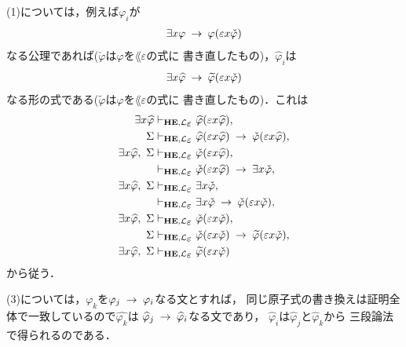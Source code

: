 \begin{metaprf}
		(1)については，例えば$\varphi_{i}$が
		\begin{align}
			\exists x \varphi \hspace{0.25em}\rightarrow\hspace{0.25em} \varphi(\varepsilon x \check{\varphi})
		\end{align}
		なる公理であれば($\check{\varphi}$は$\varphi$を$\lang{\varepsilon}$の式に
		書き直したもの)，$\widehat{\varphi}_{i}$は
		\begin{align}
			\exists x \widehat{\varphi} \hspace{0.25em}\rightarrow\hspace{0.25em} \widetilde{\varphi}(\varepsilon x \check{\varphi})
		\end{align}
		なる形の式である($\widetilde{\varphi}$は$\varphi$を$\lang{\varepsilon}$の式に
		書き直したもの)．これは
		\begin{align}
			\exists x \widehat{\varphi} &\provable{\mbox{{\bf HE}},\lang{\varepsilon}} \widehat{\varphi}(\varepsilon x \widehat{\varphi}), \\
			\Sigma &\provable{\mbox{{\bf HE}},\lang{\varepsilon}} \widehat{\varphi}(\varepsilon x \widehat{\varphi}) \rarrow \check{\varphi}(\varepsilon x \widehat{\varphi}), \\
			\exists x \widehat{\varphi},\ \Sigma &\provable{\mbox{{\bf HE}},\lang{\varepsilon}} \check{\varphi}(\varepsilon x \widehat{\varphi}), \\
			&\provable{\mbox{{\bf HE}},\lang{\varepsilon}} \check{\varphi}(\varepsilon x \widehat{\varphi}) \rarrow \exists x \check{\varphi}, \\
			\exists x \widehat{\varphi},\ \Sigma &\provable{\mbox{{\bf HE}},\lang{\varepsilon}} \exists x \check{\varphi}, \\
			&\provable{\mbox{{\bf HE}},\lang{\varepsilon}} \exists x \check{\varphi} \rarrow \check{\varphi}(\varepsilon x \check{\varphi}), \\
			\exists x \widehat{\varphi},\ \Sigma &\provable{\mbox{{\bf HE}},\lang{\varepsilon}} \check{\varphi}(\varepsilon x \check{\varphi}), \\
			\Sigma &\provable{\mbox{{\bf HE}},\lang{\varepsilon}} \check{\varphi}(\varepsilon x \check{\varphi}) \rarrow  \widetilde{\varphi}(\varepsilon x \check{\varphi}), \\
			\exists x \widehat{\varphi},\ \Sigma &\provable{\mbox{{\bf HE}},\lang{\varepsilon}} \widetilde{\varphi}(\varepsilon x \check{\varphi})
		\end{align}
		から従う．
		
		(3)については，$\varphi_{k}$を$\varphi_{j} \hspace{0.25em}\rightarrow\hspace{0.25em} \varphi_{i}$なる文とすれば，
		同じ原子式の書き換えは証明全体で一致しているので$\widehat{\varphi_{k}}$は
		$\widehat{\varphi}_{j} \hspace{0.25em}\rightarrow\hspace{0.25em} \widehat{\varphi}_{i}$なる文であり，
		$\widehat{\varphi}_{i}$は$\widehat{\varphi}_{j}$と$\widehat{\varphi}_{k}$から
		三段論法で得られるのである．
		

\end{metaprf}
